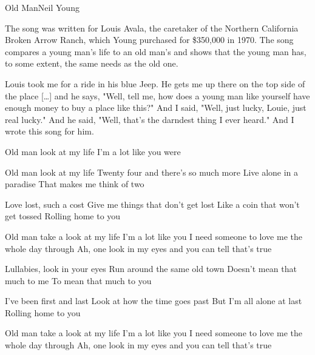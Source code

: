 \documentclass[a4paper,11pt,french]{article}
\begin{document}
\begin{Song}{Old Man}{Neil Young}

\begin{Paratext}
The song was written for Louis Avala, the caretaker of the Northern California Broken Arrow Ranch, which Young purchased for \$350,000 in 1970. The song compares a young man's life to an old man's and shows that the young man has, to some extent, the same needs as the old one.

\og Louis took me for a ride in his blue Jeep. He gets me up there on the top side of the place [\dots] and he says, "Well, tell me, how does a young man like yourself have enough money to buy a place like this?" And I said, "Well, just lucky, Louie, just real lucky." And he said, "Well, that's the darndest thing I ever heard." And I wrote this song for him.\fg
\end{Paratext}

\begin{multicols}{2}

\begin{Verse}
Old man look at my life
I'm a lot like you were
\bis
\espaceInterStrophe

Old man look at my life
Twenty four
and there's so much more
Live alone in a paradise
That makes me think of two
\espaceInterStrophe

Love lost, such a cost
Give me things
that don't get lost
Like a coin that won't get tossed
Rolling home to you
\end{Verse}
\espaceInterStrophe

\begin{Chorus}
Old man take a look at my life
I'm a lot like you
I need someone to love me
the whole day through
Ah, one look in my eyes
and you can tell that's true
\end{Chorus}
\espaceInterStrophe

\begin{Verse}
Lullabies, look in your eyes
Run around the same old town
Doesn't mean that much to me
To mean that much to you
\espaceInterStrophe

I've been first and last
Look at how the time goes past
But I'm all alone at last
Rolling home to you
\end{Verse}
\espaceInterStrophe

\begin{Chorus}
Old man take a look at my life
I'm a lot like you
I need someone to love me
the whole day through
Ah, one look in my eyes
and you can tell that's true
\end{Chorus}
\espaceInterStrophe


\end{multicols}
\end{Song}
\end{document}
